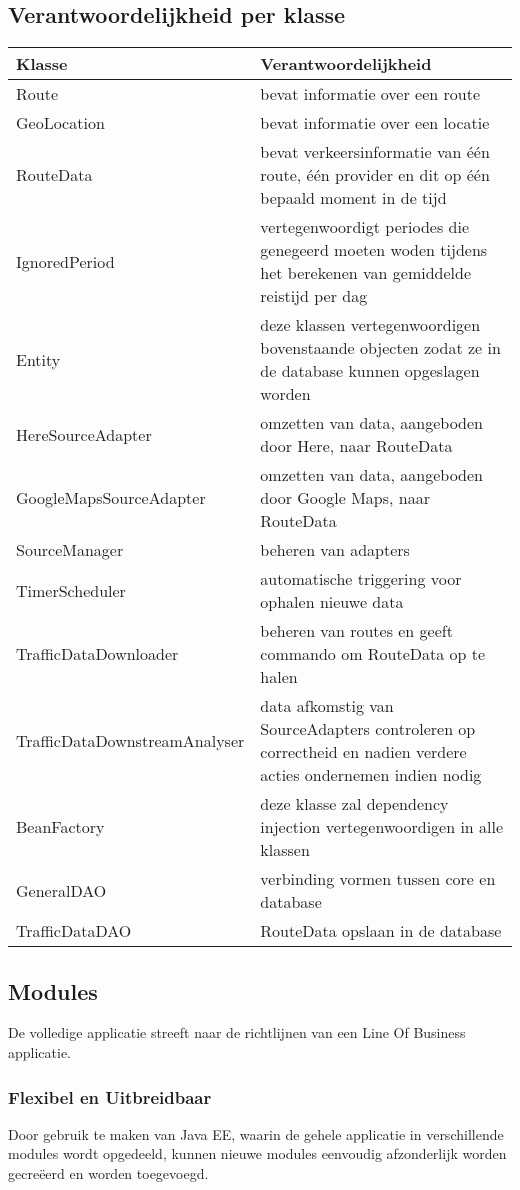 \documentclass[ps,a4paper,oneside]{report}
\begin{document}
\subsection{Verantwoordelijkheid per klasse}
\begin{tabular}{ | l | p{6.5cm}| }
	\hline
	\textbf{Klasse} & \textbf{Verantwoordelijkheid} \\
	\hline
	Route & bevat informatie over een route \\
	\hline
	GeoLocation & bevat informatie over een locatie \\
	\hline
	RouteData & bevat verkeersinformatie van \'e\'en route, \'e\'en provider en dit op \'e\'en bepaald moment in de tijd \\
	\hline
	IgnoredPeriod & vertegenwoordigt periodes die genegeerd moeten woden tijdens het berekenen van gemiddelde reistijd per dag\\
	\hline
	[Object]Entity & deze klassen vertegenwoordigen bovenstaande objecten zodat ze in de database kunnen opgeslagen worden\\
	\hline
	HereSourceAdapter & omzetten van data, aangeboden door Here, naar RouteData\\	
	\hline
	GoogleMapsSourceAdapter & omzetten van data, aangeboden door Google Maps, naar RouteData\\	
	\hline
	SourceManager & beheren van adapters\\	
	\hline
	TimerScheduler & automatische triggering voor ophalen nieuwe data\\	
	\hline
	TrafficDataDownloader & beheren van routes en geeft commando om RouteData op te halen\\	
	\hline
	TrafficDataDownstreamAnalyser & data afkomstig van SourceAdapters controleren op correctheid en nadien verdere acties ondernemen indien nodig\\		
	\hline
	BeanFactory & deze klasse zal dependency injection vertegenwoordigen in alle klassen \\	
	\hline
	GeneralDAO & verbinding vormen tussen core en database\\	
	\hline
	TrafficDataDAO & RouteData opslaan in de database\\	
	\hline
\end{tabular}
\subsection{Modules}
De volledige applicatie streeft naar de richtlijnen van een Line Of Business applicatie. 
\subsubsection{Flexibel en Uitbreidbaar}
Door gebruik te maken van Java EE, waarin de gehele applicatie in verschillende modules wordt opgedeeld, kunnen nieuwe modules eenvoudig afzonderlijk worden gecre\"eerd en worden toegevoegd. 
\end{document}
